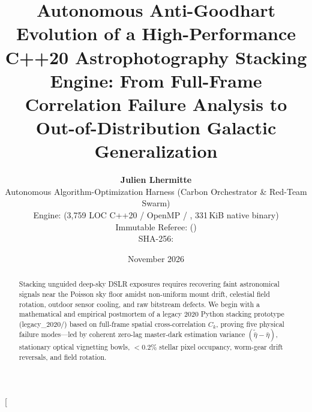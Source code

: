 \documentclass[10pt,twocolumn,letterpaper]{article}
\title{\vspace{-1.2em}\textbf{\Large Autonomous Anti-Goodhart Evolution of a High-Performance C++20 Astrophotography Stacking Engine: From Full-Frame Correlation Failure Analysis to Out-of-Distribution Galactic Generalization}\vspace{-0.4em}}
\author{
  \normalsize\textbf{Julien Lhermitte}\\[0.2em]
  \small Autonomous Algorithm-Optimization Harness (Carbon Orchestrator \& Red-Team Swarm)\\
  \small Engine: \code{cpp\_stacker/} (3,759 LOC C++20 / OpenMP / \code{LibRaw}, 331\,KiB native binary)\\
  \footnotesize Immutable Referee: \code{scripts/evaluate.py} (\code{chmod 444})\\
  \footnotesize SHA-256: \code{971b62f072143eb6172cd804f85750b7c31c507fbd13879ed4d1a46b50c415f9}
  \vspace{-0.8em}
}
\date{November 2026}
\DeclareRobustCommand{\code}[1]{\texttt{#1}}
\def\code#1{#1}%
\def\bm#1{#1}%
\begin{document}
\twocolumn[%
  \begin{@twocolumnfalse}%
    \maketitle
    \begin{abstract}
      \noindent Stacking unguided deep-sky DSLR exposures requires recovering faint astronomical signals near the Poisson sky floor amidst non-uniform mount drift, celestial field rotation, outdoor sensor cooling, and raw bitstream defects. We begin with a mathematical and empirical postmortem of a legacy 2020 Python stacking prototype (\code{legacy\_2020/}) based on full-frame spatial cross-correlation $C_{\bm{k}}$, proving five physical failure modes---led by coherent zero-lag master-dark estimation variance $(\tilde{\bar{\eta}} - \bar{\eta})$, stationary optical vignetting bowls, $<0.2\%$ stellar pixel occupancy, worm-gear drift reversals, and field rotation.


\end{abstract}
\end{@twocolumnfalse}
\end{document}

